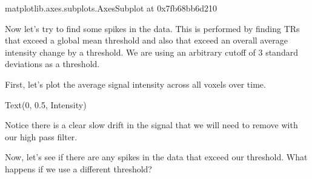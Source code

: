 \documentclass[letterpaper,10pt,english]{sphinxmanual}
\begin{document}
\begin{sphinxVerbatim}[commandchars=\\\{\}]
\PYGZlt{}matplotlib.axes.\PYGZus{}subplots.AxesSubplot at 0x7fb68bb6d210\PYGZgt{}
\end{sphinxVerbatim}

\noindent{}

Now let’s try to find some spikes in the data. This is performed by finding TRs that exceed a global mean threshold and also that exceed an overall average intensity change by a threshold.  We are using an arbitrary cutoff of 3 standard deviations as a threshold.

First, let’s plot the average signal intensity across all voxels over time.

\begin{sphinxVerbatim}[commandchars=\\\{\}]
  
 
 
\end{sphinxVerbatim}

\begin{sphinxVerbatim}[commandchars=\\\{\}]
Text(0, 0.5, \PYGZsq{}Intensity\PYGZsq{})
\end{sphinxVerbatim}

\noindent{}

Notice there is a clear slow drift in the signal that we will need to remove with our high pass filter.

Now, let’s see if there are any spikes in the data that exceed our threshold. What happens if we use a different threshold?
\end{document}

